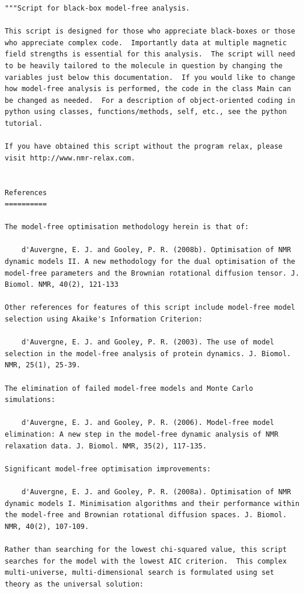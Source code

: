 \begin{lstlisting}
"""Script for black-box model-free analysis.

This script is designed for those who appreciate black-boxes or those who appreciate complex code.  Importantly data at multiple magnetic field strengths is essential for this analysis.  The script will need to be heavily tailored to the molecule in question by changing the variables just below this documentation.  If you would like to change how model-free analysis is performed, the code in the class Main can be changed as needed.  For a description of object-oriented coding in python using classes, functions/methods, self, etc., see the python tutorial.

If you have obtained this script without the program relax, please visit http://www.nmr-relax.com.


References
==========

The model-free optimisation methodology herein is that of:

    d'Auvergne, E. J. and Gooley, P. R. (2008b). Optimisation of NMR dynamic models II. A new methodology for the dual optimisation of the model-free parameters and the Brownian rotational diffusion tensor. J. Biomol. NMR, 40(2), 121-133

Other references for features of this script include model-free model selection using Akaike's Information Criterion:

    d'Auvergne, E. J. and Gooley, P. R. (2003). The use of model selection in the model-free analysis of protein dynamics. J. Biomol. NMR, 25(1), 25-39.

The elimination of failed model-free models and Monte Carlo simulations:

    d'Auvergne, E. J. and Gooley, P. R. (2006). Model-free model elimination: A new step in the model-free dynamic analysis of NMR relaxation data. J. Biomol. NMR, 35(2), 117-135.

Significant model-free optimisation improvements:

    d'Auvergne, E. J. and Gooley, P. R. (2008a). Optimisation of NMR dynamic models I. Minimisation algorithms and their performance within the model-free and Brownian rotational diffusion spaces. J. Biomol. NMR, 40(2), 107-109.

Rather than searching for the lowest chi-squared value, this script searches for the model with the lowest AIC criterion.  This complex multi-universe, multi-dimensional search is formulated using set theory as the universal solution:


\end{lstlisting}
